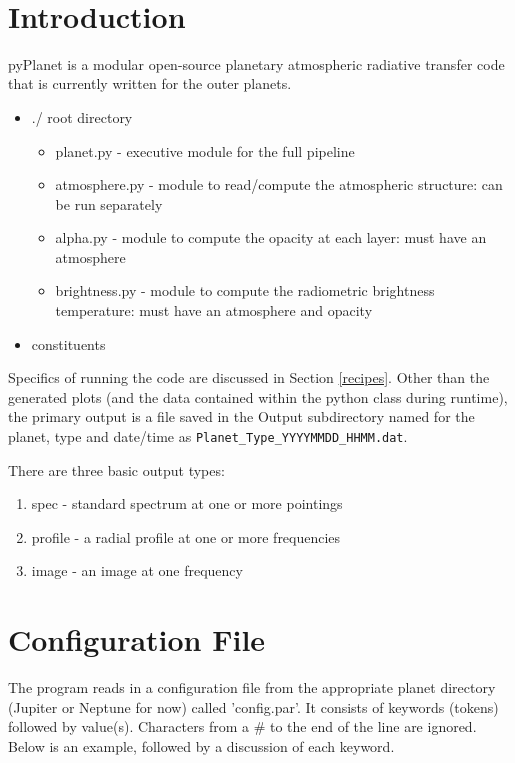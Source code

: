 \documentclass[11pt]{article}
\begin{document}
{ \\}
\vspace*{0.5cm}

\section{Introduction} 
pyPlanet is a modular open-source planetary atmospheric radiative transfer code that is currently written for the outer planets.  

\begin{itemize}
\item ./ root directory 
	\begin{itemize}
	\item planet.py - executive module for the full pipeline
	\item atmosphere.py - module to read/compute the atmospheric structure: can be run separately
	\item alpha.py - module to compute the opacity at each layer:  must have an atmosphere
	\item brightness.py - module to compute the radiometric brightness temperature:  must have an atmosphere and opacity
	\end{itemize}
\item constituents
\end{itemize}

Specifics of running the code are discussed in Section \ref{recipes}.  Other than the generated plots (and the data contained within the python class during runtime), the primary output is a file saved in the Output subdirectory named for the planet, type and date/time as {\tt Planet\_Type\_YYYYMMDD\_HHMM.dat}.

There are three basic output types:
\begin{enumerate}
	\item spec - standard spectrum at one or more pointings
	\item profile - a radial profile at one or more frequencies
	\item image - an image at one frequency
\end{enumerate}

\section{Configuration File}
The program reads in a configuration file from the appropriate planet directory (Jupiter or Neptune for now) called 'config.par'.  It consists of keywords (tokens) followed by value(s).  Characters from a \# to the end of the line are ignored.
Below is an example, followed by a discussion of each keyword.
\end{document}
